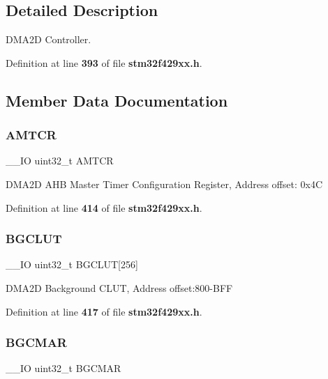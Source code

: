 \subsection{Detailed Description}
D\+M\+A2D Controller. 

Definition at line \textbf{ 393} of file \textbf{ stm32f429xx.\+h}.



\subsection{Member Data Documentation}
\mbox{\label{structDMA2D__TypeDef_a9f16d1904f085dbd51466994f01bd9e2}} 
\subsubsection{A\+M\+T\+CR}
{\footnotesize\ttfamily \+\_\+\+\_\+\+IO uint32\+\_\+t A\+M\+T\+CR}

D\+M\+A2D A\+HB Master Timer Configuration Register, Address offset\+: 0x4C 

Definition at line \textbf{ 414} of file \textbf{ stm32f429xx.\+h}.

\mbox{\label{structDMA2D__TypeDef_ac6cd6efd0eadd0504f15f963e54cf8f5}} 
\subsubsection{B\+G\+C\+L\+UT}
{\footnotesize\ttfamily \+\_\+\+\_\+\+IO uint32\+\_\+t B\+G\+C\+L\+UT[256]}

D\+M\+A2D Background C\+L\+UT, Address offset\+:800-\/\+B\+FF 

Definition at line \textbf{ 417} of file \textbf{ stm32f429xx.\+h}.

\mbox{\label{structDMA2D__TypeDef_a8108e797e9421f12d2fa5b7bca1d8a12}} 
\subsubsection{B\+G\+C\+M\+AR}
{\footnotesize\ttfamily \+\_\+\+\_\+\+IO uint32\+\_\+t B\+G\+C\+M\+AR}

